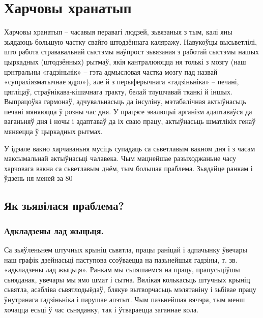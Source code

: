 \chapter{Харчовы хранатып}

Харчовы хранатып – часавыя перавагі людзей, зьвязаныя з тым, калі яны зьядаюць большую частку свайго штодзённага каляражу. Навукоўцы высьветлілі, што работа стрававальнай сыстэмы наўпрост зьвязаная з работай сыстэмы нашых цыркадных (штодзённых) рытмаў, якія кантралююцца ня толькі з мозгу (наш цэнтральны «гадзіньнік» – гэта адмысловая частка мозгу пад назвай «супрахіязматычнае ядро»), але й з перыферычнага «гадзіньніка» – печані, цягліцаў, страўнікава-кішачнага тракту, белай тлушчавай тканкі й іншых. Выпрацоўка гармонаў, адчувальнасьць да інсуліну, мэтабалічная актыўнасьць печані мяняюцца ў розны час дня. У працэсе эвалюцыі арганізм адаптаваўся да ваганьняў дня і ночы і адаптаваў да іх сваю працу, актыўнасьць шматлікіх генаў мяняецца ў цыркадных рытмах.

У ідэале вакно харчаваньня мусіць супадаць са сьветлавым вакном дня і з часам максымальнай актыўнасьці чалавека. Чым мацнейшае разыходжаньне часу харчовага вакна са сьветлавым днём, тым большая праблема. Зьядайце ранкам і ўдзень ня меней за 80%

\section{Як зьявілася праблема?}

\subsection{Адкладзены лад жыцьця.}
Са зьяўленьнем штучных крыніц сьвятла, працы раніцай і адпачынку ўвечары наш графік дзейнасьці паступова ссоўваецца на пазьнейшыя гадзіны, т. зв. «адкладзены лад жыцьця». Ранкам мы сьпяшаемся на працу, прапусьціўшы сьняданак, увечары мы ямо шмат і сытна. Вялікая колькасьць штучных крыніц сьвятла, асабліва сьвятлодыёдаў, блякуе вытворчасьць мэлятаніну і зьбівае працу ўнутранага гадзіньніка і парушае апэтыт. Чым пазьнейшая вячэра, тым менш хочацца есьці ў час сьняданку, так і ўтвараецца заганнае кола.

